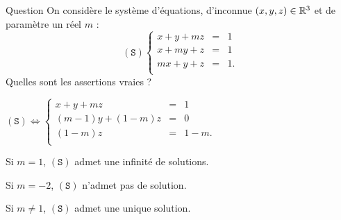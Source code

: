 \begin{multi}[multiple,feedback=
{\[(\mathtt{S}) \Leftrightarrow  
\left\{\begin{array}{rcc}
x+y+mz&=&1\\
(m-1)y+(1-m)z&=&0\\ 
(1-m)y+(1-m^2)z&=&1-m\\
\end{array}\right. \Leftrightarrow  
\left\{\begin{array}{rcc}
x+y+mz&=&1\\
(m-1)y+(1-m)z&=&0\\ 
(1-m)(2+m)z&=&1-m.\\
\end{array}\right. \]
\begin{enumerate}
\item[-]Si \(m=1\), \((\mathtt{S}) \Leftrightarrow  x+y+z=1 \) admet une infinité de solutions.
\item[-]Si \(m=-2\), \((\mathtt{S})\) n'admet pas de solution.
\item[-]Si \(m\neq 1\) et \(m\neq -2\),  \((\mathtt{S})\) admet une unique solution.
\end{enumerate}
}]{Question}
On considère le système d'équations, d'inconnue \((x,y,z)\in \mathbb{R}^3\) et de paramètre un réel  \(m\) : 
\[(\mathtt{S})  
\left\{\begin{array}{rcc}
x+y+mz&=&1\\
x+my+z&=&1\\ 
mx+y+z&=&1.\\
\end{array}\right.\]
Quelles sont les assertions vraies ?

    \item \((\mathtt{S})  \Leftrightarrow
\left\{\begin{array}{rcc}
x+y+mz&=&1\\
(m-1)y+(1-m)z&=&0\\
(1-m)z&=&1-m.\\
\end{array}\right.\)
    \item* Si \(m =1\),  \((\mathtt{S})\) admet une infinité de solutions.
    \item* Si \(m=-2\), \((\mathtt{S})\) n'admet pas de solution.
    \item Si \(m\neq 1\),  \((\mathtt{S})\) admet une unique solution.
\end{multi}



